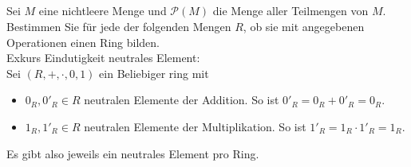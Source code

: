 \documentclass{article}
\begin{document}
\subsection{}
\color{blue}
Sei $M$ eine nichtleere Menge und $\mathcal P(M)$ die Menge
aller Teilmengen von $M$.
Bestimmen Sie für jede der folgenden Mengen $R$, ob sie mit
angegebenen Operationen einen Ring bilden.\\
\color{purple}
Exkurs Eindutigkeit neutrales Element:\\
Sei $(R,+,\cdot,0,1)$ ein Beliebiger ring mit
\begin{itemize}
    \item
        $0_R,0'_R\in R$ neutralen Elemente der Addition.
        So ist $0'_R=0_R+0'_R=0_R$.
    \item
        $1_R,1'_R\in R$ neutralen Elemente der
        Multiplikation.
        So ist $1'_R=1_R\cdot 1'_R=1_R$.
\end{itemize}
Es gibt also jeweils ein neutrales Element pro Ring.
\color{black}
\end{document}
